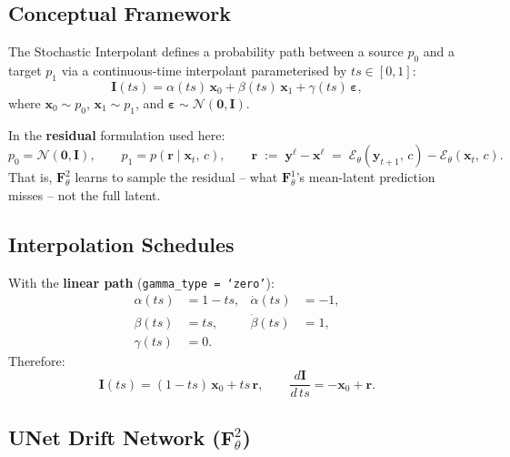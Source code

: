 \documentclass[11pt]{article}
\begin{document}
\subsection{Conceptual Framework}

The Stochastic Interpolant \cite{albergo2022building} defines a probability
path between a source $p_0$ and a target $p_1$ via a continuous-time
interpolant parameterised by $ts \in [0,1]$:
\begin{equation}
  \mathbf{I}(ts)
  = \alpha(ts)\,\mathbf{x}_0
  + \beta(ts)\,\mathbf{x}_1
  + \gamma(ts)\,\bm{\varepsilon},
\end{equation}
where $\mathbf{x}_0 \sim p_0$, $\mathbf{x}_1 \sim p_1$, and
$\bm{\varepsilon} \sim \mathcal{N}(\mathbf{0}, \mathbf{I})$.

In the \textbf{residual} formulation used here:
\begin{equation}
  p_0 = \mathcal{N}(\mathbf{0}, \mathbf{I}),
  \qquad
  p_1 = p\!\left(\mathbf{r} \mid \mathbf{x}_t,\,c\right),
  \qquad
  \mathbf{r}
  \;:=\; \mathbf{y}^{\ell} - \mathbf{x}^{\ell}
  \;=\; \mathcal{E}_\theta(\mathbf{y}_{t+1},\,c)
       - \mathcal{E}_\theta(\mathbf{x}_t,\,c).
\end{equation}
That is, $\mathbf{F}^2_\theta$ learns to sample the residual -- what
$\mathbf{F}^1_\theta$'s mean-latent prediction misses -- not the full latent.

\subsection{Interpolation Schedules}

With the \textbf{linear path} (\texttt{gamma\_type = `zero'}):
\begin{align}
  \alpha(ts) &= 1 - ts, & \dot{\alpha}(ts) &= -1,\\
  \beta(ts)  &= ts,     & \dot{\beta}(ts)  &=  1,\\
  \gamma(ts) &= 0.      &                  &
\end{align}
Therefore:
\begin{equation}
  \mathbf{I}(ts) = (1-ts)\,\mathbf{x}_0 + ts\,\mathbf{r},
  \qquad
  \frac{d\mathbf{I}}{d\,ts} = -\mathbf{x}_0 + \mathbf{r}.
\end{equation}

\subsection{UNet Drift Network ($\mathbf{F}^2_\theta$)}
\end{document}

